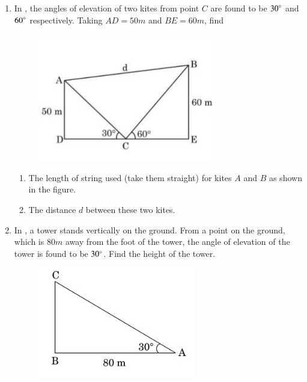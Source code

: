 \begin{enumerate}[label=\thesubsection.\arabic*.,ref=\thesubsection.\theenumi]
\item In , the angles of elevation of two kites from point $C$ are found to be ${30}\degree$ and  ${60}\degree$ respectively. Taking $AD = 50m $  and $ BE = 60m$,
find
    \begin{figure}[H]
        \centering
        \includegraphics[width=\columnwidth]{cbse/figs/kites.jpeg}
        \caption{}
        \label{fig:kites5}
    \end{figure}
\begin{enumerate}
\item The length of string used (take them straight) for kites $A$ and $B$ as shown in the figure.
\item The distance $d$ between these two kites.
\end{enumerate}
\hfill{}
\item In  , a tower stands vertically on the ground. From a point on the ground, which is $80m$ away from the foot of the tower, the angle of elevation of the tower is found to be $30\degree$. Find the height of the tower.
    \hfill{}
    \begin{figure}[H]
        \centering
        \includegraphics[width=\columnwidth]{cbse/figs/as.jpeg}

\end{figure}
\end{enumerate}
